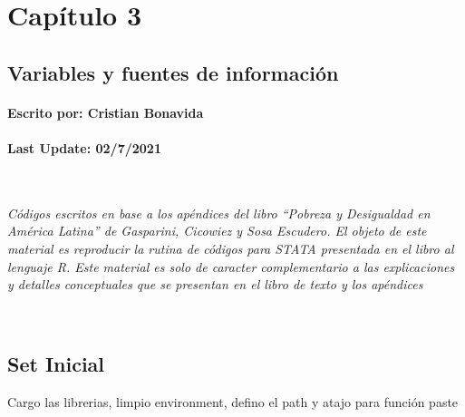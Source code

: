 \documentclass[
]{book}
\begin{document}
\hypertarget{capuxedtulo-3}{%
\chapter{Capítulo 3}\label{capuxedtulo-3}}

\hypertarget{variables-y-fuentes-de-informaciuxf3n}{%
\section*{Variables y fuentes de información}\label{variables-y-fuentes-de-informaciuxf3n}}

\hypertarget{escrito-por-cristian-bonavida-1}{%
\subsubsection*{Escrito por: Cristian Bonavida}\label{escrito-por-cristian-bonavida-1}}

\hypertarget{last-update-0272021-1}{%
\subsubsection*{Last Update: 02/7/2021}\label{last-update-0272021-1}}

~

\emph{Códigos escritos en base a los apéndices del libro ``Pobreza y Desigualdad en América Latina'' de Gasparini, Cicowiez y Sosa Escudero. El objeto de este material es reproducir la rutina de códigos para STATA presentada en el libro al lenguaje R. Este material es solo de caracter complementario a las explicaciones y detalles conceptuales que se presentan en el libro de texto y los apéndices}

~

\hypertarget{set-inicial-1}{%
\section*{Set Inicial}\label{set-inicial-1}}

Cargo las librerias, limpio environment, defino el path y atajo para función paste
\end{document}
